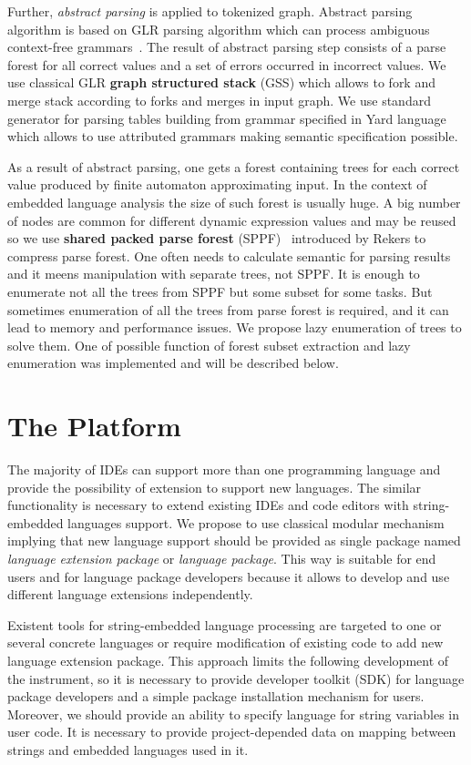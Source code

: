 \documentclass{acm_proc_article-sp}
\begin{document}
Further, {\it abstract parsing} is applied to tokenized graph. Abstract parsing algorithm is based on GLR parsing algorithm which can process ambiguous context-free grammars~\cite{AGLR}. The result of abstract parsing step consists of a parse forest for all correct values and a set of errors occurred in incorrect values. We use classical GLR {\bf graph structured stack} (GSS) which allows to fork and merge stack according to forks and merges in input graph. We use standard generator for parsing tables building from grammar specified in Yard language~\cite{YARD} which allows to use attributed grammars making semantic specification possible. 

As a result of abstract parsing, one gets a forest containing trees for each correct value produced by finite automaton approximating input. In the context of embedded language analysis the size of such forest is usually huge. A big number of nodes are common for different dynamic expression values and may be reused so we use {\bf shared packed parse forest} (SPPF)~\cite{SPPF} introduced by Rekers to compress parse forest. One often needs to calculate semantic for parsing results and it meens manipulation with separate trees, not SPPF. It is enough to enumerate not all the trees from SPPF but some subset for some tasks. But sometimes enumeration of all the trees from parse forest is required, and it can lead to memory and performance issues. We propose lazy enumeration of trees to solve them. One of possible function of forest subset extraction and lazy enumeration was implemented and will be described below.


\section{The Platform}

The majority of IDEs can support more than one programming language and provide the possibility of extension to support new languages. The similar functionality is necessary to extend existing IDEs and code editors with string-embedded languages support. We propose to use classical modular mechanism implying that new language support should be provided as single package named {\it language extension package} or {\it language package}. This way is suitable for end users and for language package developers because it allows to develop and use different language extensions independently. 

Existent tools for string-embedded language processing are targeted to one or several concrete languages or require modification of existing code to add new language extension package. This approach limits the following development of the instrument, so it is necessary to provide developer toolkit (SDK) for language package developers and a simple package installation mechanism for users. Moreover, we should provide an ability to specify language for string variables in user code. It is necessary to provide project-depended data on mapping between strings and embedded languages used in it.
\end{document}
